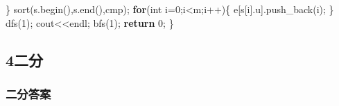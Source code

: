 \documentclass[
]{article}
\newenvironment{Shaded}{}{}
\newcommand{\ControlFlowTok}[1]{\textcolor[rgb]{0.00,0.44,0.13}{\textbf{#1}}}
\newcommand{\DataTypeTok}[1]{\textcolor[rgb]{0.56,0.13,0.00}{#1}}
\newcommand{\DecValTok}[1]{\textcolor[rgb]{0.25,0.63,0.44}{#1}}
\newcommand{\NormalTok}[1]{#1}
\newcommand{\OperatorTok}[1]{\textcolor[rgb]{0.40,0.40,0.40}{#1}}
\begin{document}
\begin{Shaded}
\begin{Highlighting}[]
	\OperatorTok{\}}
\NormalTok{	sort}\OperatorTok{(}\NormalTok{s}\OperatorTok{.}\NormalTok{begin}\OperatorTok{(),}\NormalTok{s}\OperatorTok{.}\NormalTok{end}\OperatorTok{(),}\NormalTok{cmp}\OperatorTok{);}
	\ControlFlowTok{for}\OperatorTok{(}\DataTypeTok{int}\NormalTok{ i}\OperatorTok{=}\DecValTok{0}\OperatorTok{;}\NormalTok{i}\OperatorTok{\textless{}}\NormalTok{m}\OperatorTok{;}\NormalTok{i}\OperatorTok{++)\{}
\NormalTok{		e}\OperatorTok{[}\NormalTok{s}\OperatorTok{[}\NormalTok{i}\OperatorTok{].}\NormalTok{u}\OperatorTok{].}\NormalTok{push\_back}\OperatorTok{(}\NormalTok{i}\OperatorTok{);}
	\OperatorTok{\}}
\NormalTok{	dfs}\OperatorTok{(}\DecValTok{1}\OperatorTok{);}
\NormalTok{	cout}\OperatorTok{\textless{}\textless{}}\NormalTok{endl}\OperatorTok{;}
\NormalTok{	bfs}\OperatorTok{(}\DecValTok{1}\OperatorTok{);}
	\ControlFlowTok{return} \DecValTok{0}\OperatorTok{;}
\OperatorTok{\}}
\end{Highlighting}
\end{Shaded}

\hypertarget{4ux4e8cux5206}{%
\subsection{4二分}\label{4ux4e8cux5206}}

\hypertarget{ux4e8cux5206ux7b54ux6848}{%
\subsubsection{二分答案}\label{ux4e8cux5206ux7b54ux6848}}
\end{document}
